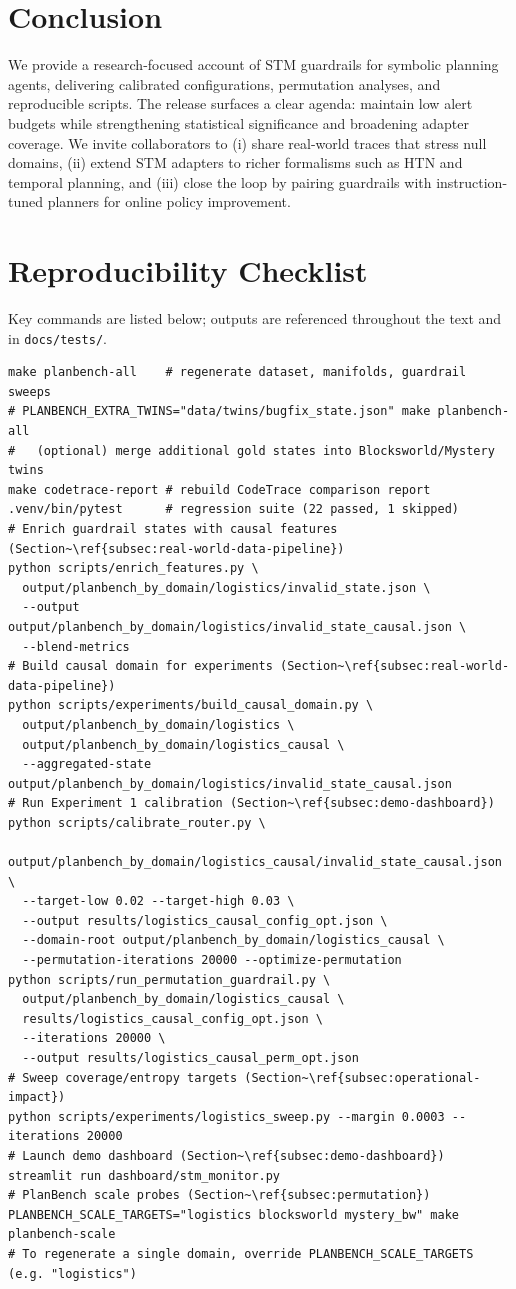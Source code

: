 \documentclass[11pt]{article}
\begin{document}
\section{Conclusion}
We provide a research-focused account of STM guardrails for symbolic planning
agents, delivering calibrated configurations, permutation analyses, and
reproducible scripts. The release surfaces a clear agenda: maintain low alert
budgets while strengthening statistical significance and broadening adapter
coverage. We invite collaborators to (i) share real-world traces that stress
null domains, (ii) extend STM adapters to richer formalisms such as HTN and
temporal planning, and (iii) close the loop by pairing guardrails with
instruction-tuned planners for online policy improvement.

\appendix

\section{Reproducibility Checklist}
Key commands are listed below; outputs are referenced throughout the text and in
\texttt{docs/tests/}.

\begin{lstlisting}[style=stm]
make planbench-all    # regenerate dataset, manifolds, guardrail sweeps
# PLANBENCH_EXTRA_TWINS="data/twins/bugfix_state.json" make planbench-all
#   (optional) merge additional gold states into Blocksworld/Mystery twins
make codetrace-report # rebuild CodeTrace comparison report
.venv/bin/pytest      # regression suite (22 passed, 1 skipped)
# Enrich guardrail states with causal features (Section~\ref{subsec:real-world-data-pipeline})
python scripts/enrich_features.py \
  output/planbench_by_domain/logistics/invalid_state.json \
  --output output/planbench_by_domain/logistics/invalid_state_causal.json \
  --blend-metrics
# Build causal domain for experiments (Section~\ref{subsec:real-world-data-pipeline})
python scripts/experiments/build_causal_domain.py \
  output/planbench_by_domain/logistics \
  output/planbench_by_domain/logistics_causal \
  --aggregated-state output/planbench_by_domain/logistics/invalid_state_causal.json
# Run Experiment 1 calibration (Section~\ref{subsec:demo-dashboard})
python scripts/calibrate_router.py \
  output/planbench_by_domain/logistics_causal/invalid_state_causal.json \
  --target-low 0.02 --target-high 0.03 \
  --output results/logistics_causal_config_opt.json \
  --domain-root output/planbench_by_domain/logistics_causal \
  --permutation-iterations 20000 --optimize-permutation
python scripts/run_permutation_guardrail.py \
  output/planbench_by_domain/logistics_causal \
  results/logistics_causal_config_opt.json \
  --iterations 20000 \
  --output results/logistics_causal_perm_opt.json
# Sweep coverage/entropy targets (Section~\ref{subsec:operational-impact})
python scripts/experiments/logistics_sweep.py --margin 0.0003 --iterations 20000
# Launch demo dashboard (Section~\ref{subsec:demo-dashboard})
streamlit run dashboard/stm_monitor.py
# PlanBench scale probes (Section~\ref{subsec:permutation})
PLANBENCH_SCALE_TARGETS="logistics blocksworld mystery_bw" make planbench-scale
# To regenerate a single domain, override PLANBENCH_SCALE_TARGETS (e.g. "logistics")
\end{lstlisting}
\end{document}
